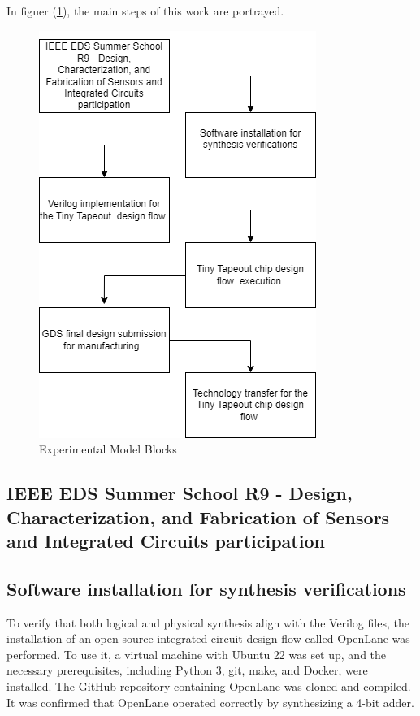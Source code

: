  In figuer (\ref{fig:ExpModelBlocks}), the main steps of this work 
 are portrayed.


 \begin{figure}[H]
    \centering
    \includegraphics[scale=0.6]{Pictures/ExperimentalModel.png}
    \caption{Experimental Model Blocks}
    \label{fig:ExpModelBlocks}
\end{figure}
\subsection{IEEE EDS Summer School R9 - Design, Characterization, and Fabrication of Sensors and Integrated Circuits participation}

\subsection{Software installation for synthesis verifications}

To verify that both logical and physical synthesis align with the Verilog files, the installation of an  open-source integrated circuit design flow called OpenLane was performed. To use it, a virtual machine with Ubuntu 22 was set up, and the necessary prerequisites, including Python 3, git, make, and Docker, were installed. The GitHub repository containing OpenLane was cloned and compiled. It was confirmed that OpenLane operated correctly by synthesizing a 4-bit adder.
 

